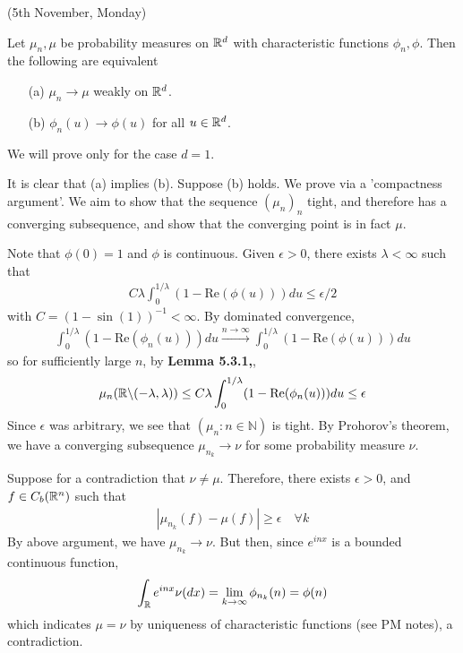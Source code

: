 \documentclass[12pt,a4paper]{report}
\newenvironment{proof}
{\begin{changemargin}{1cm}{0.5cm} 
	}%
	{\end{changemargin}
}
\begin{document}
(5th November, Monday)
\s

 Let $\mu_n, \mu$ be probability measures on $\mathbb{R}^d$ with characteristic functions $\phi_n, \phi$. Then the following are equivalent
\begin{itemize}
\item[(a)] $\mu_n \rightarrow \mu$ weakly on $\mathbb{R}^d$.
\item[(b)] $\phi_n(u) \rightarrow \phi(u)$ for all $u\in \mathbb{R}^d$.
\end{itemize}
We will prove only for the case $d=1$.
\begin{proof}
\pf It is clear that (a) implies (b). Suppose (b) holds. We prove via a 'compactness argument'. We aim to show that the sequence $(\mu_n)_n$ tight, and therefore has a converging subsequence, and show that the converging point is in fact $\mu$.

\quad Note that $\phi(0) = 1$ and $\phi$ is continuous. Given $\epsilon >0$, there exists $\lambda < \infty$ such that
\begin{align*}
C \lambda \int^{1/\lambda}_0 (1- \text{Re}(\phi(u))) du \leq \epsilon/2
\end{align*}
with $C = (1- \sin(1))^{-1} < \infty$. By dominated convergence,
\begin{align*}
\int_0^{1/\lambda} (1- \text{Re}(\phi_n(u))) du \xrightarrow{n\rightarrow \infty} \int^{1/\lambda}_0 (1- \text{Re}(\phi(u))) du
\end{align*}
so for sufficiently large $n$, by \textbf{Lemma 5.3.1,},
\begin{align*}
\mu_n (\mathbb{R} \backslash (-\lambda , \lambda)) \leq C\lambda \int^{1/\lambda}_0 (1- \text{Re}(\phi_n(u))) du \leq \epsilon
\end{align*}
Since $\epsilon$ was arbitrary, we see that $(\mu_n : n\in \mathbb{N})$ is tight. By Prohorov's theorem, we have a converging subsequence $\mu_{n_k} \rightarrow \nu$ for some probability measure $\nu$.

\quad Suppose for a contradiction that $\nu \neq \mu$. Therefore, there exists $\epsilon >0$, and $f\in C_b(\mathbb{R}^n)$ such that
\begin{align*}
|\mu_{n_k} (f) - \mu(f)| \geq \epsilon \quad \forall k
\end{align*}
By above argument, we have $\mu_{n_k} \rightarrow \nu$. But then, since $e^{inx}$ is a bounded continuous function,
\begin{align*}
\int_{\mathbb{R}} e^{inx} \nu(dx) = \lim_{k\rightarrow \infty} \phi_{n_k}(n) = \phi(n)
\end{align*}
which indicates $\mu = \nu$ by uniqueness of characteristic functions (see PM notes), a contradiction.

\eop
\end{proof}
\s
\end{document}
